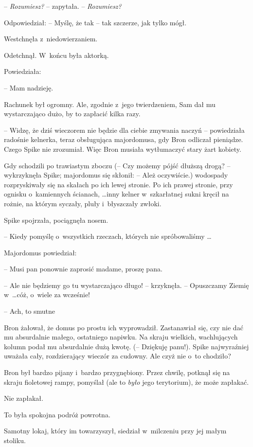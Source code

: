 \documentclass[oneside,polish,11pt,rmheadings]{mwbk}
\begin{document}
-- \textit{Rozumiesz?} -- zapytała. -- \textit{Rozumiesz?} 

Odpowiedział: -- Myślę, że tak -- tak szczerze, jak tylko mógł. 

Westchnęła z~niedowierzaniem. 

Odetchnął. W~końcu była aktorką. 

Powiedziała: 

-- Mam nadzieję. 

Rachunek był ogromny. Ale, zgodnie z~jego twierdzeniem, Sam dał mu wystarczająco dużo, by to zapłacić kilka razy. 

-- Widzę, że dziś wieczorem nie będzie dla ciebie zmywania naczyń -- powiedziała radośnie kelnerka, teraz obsługująca majordomusa, gdy Bron odliczał pieniądze. Czego Spike nie zrozumiał. Więc Bron musiała wytłumaczyć stary żart kobiety. 

Gdy schodzili po trawiastym zboczu (-- Czy możemy pójść dłuższą drogą? -- wykrzyknęła Spike; majordomus się skłonił: -- Ależ oczywiście.) wodospady rozpryskiwały się na skałach po ich lewej stronie. Po ich prawej stronie, przy ognisku o~kamiennych ścianach, \ldots  inny kelner w~szkarłatnej sukni kręcił na rożnie, na którym syczały, pluły i~błyszczały zwłoki. 

Spike spojrzała, pociągnęła nosem. 

-- Kiedy pomyślę o~wszystkich rzeczach, których nie spróbowaliśmy \ldots  

Majordomus powiedział: 

-- Musi pan ponownie zaprosić madame, proszę pana. 

-- Ale nie będziemy go tu wystarczająco długo! -- krzyknęła. -- Opuszczamy Ziemię w~\ldots  cóż, o~wiele za wcześnie! 

-- Ach, to smutne 

Bron żałował, że domus po prostu ich wyprowadził. Zastanawiał się, czy nie dać mu absurdalnie małego, ostatniego napiwku. Na skraju wielkich, wachlujących kolumn podał mu absurdalnie dużą kwotę. (-- Dziękuję panu!). Spike najwyraźniej uważała cały, rozdzierający wieczór za cudowny. Ale czyż nie o~to chodziło? 

Bron był bardzo pijany i~bardzo przygnębiony. Przez chwilę, potknął się na skraju fioletowej rampy, pomyślał (ale to \textit{było }jego terytorium), że może zapłakać. 

Nie zapłakał. 

To była spokojna podróż powrotna. 

Samotny lokaj, który im towarzyszył, siedział w~milczeniu przy jej małym stoliku. 
\end{document}

